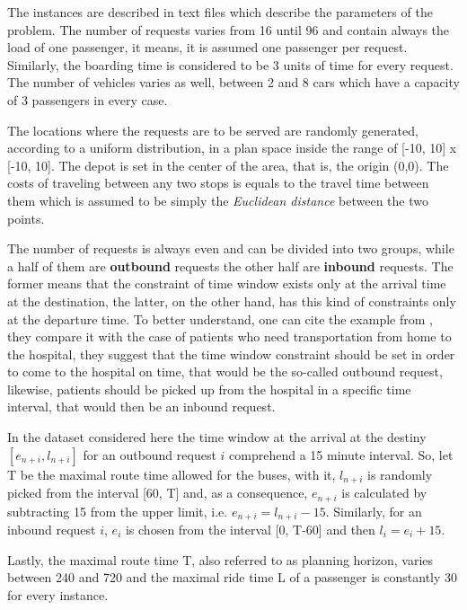 \documentclass[tuberlin,cic,tc,openright,english,noabntcite,oneside]{iiufrgs}
\begin{document}
The instances are described in text files which describe the parameters of the problem. The number of requests varies from 16 until 96 and contain always the load of one passenger, it means, it is assumed one passenger per request. Similarly, the boarding time is considered to be 3 units of time for every request. The number of vehicles varies as well, between 2 and 8 cars which have a capacity of 3 passengers in every case.

The locations where the requests are to be served are randomly generated, according to a uniform distribution, in a plan space inside the range of [-10, 10] x [-10, 10]. The depot is set in the center of the area, that is, the origin (0,0). The costs of traveling between any two stops is equals to the travel time between them which is assumed to be simply the \emph{Euclidean distance} between the two points.

The number of requests is always even and can be divided into two groups, while a half of them are \textbf{outbound} requests the other half are \textbf{inbound} requests. The former means that the constraint of time window exists only at the arrival time at the destination, the latter, on the other hand, has this kind of constraints only at the departure time. To better understand, one can cite the example from \textcite[p. 29]{cordeau_dial--ride_2007}, they compare it with the case of patients who need transportation from home to the hospital, they suggest that the time window constraint should be set in order to come to the hospital on time, that would be the so-called outbound request, likewise, patients should be picked up from the hospital in a specific time interval, that would then be an inbound request.

In the dataset considered here the time window at the arrival at the destiny $[e_{n+i}, l_{n+i}]$ for an outbound request $i$ comprehend a 15 minute interval. So, let T be the maximal route time allowed for the buses, with it, $l_{n+i}$ is randomly picked from the interval [60, T] and, as a consequence, $e_{n+i}$ is calculated by subtracting 15 from the upper limit, i.e. $e_{n+i} = l_{n+i} - 15$. Similarly, for an inbound request $i$, $e_i$ is chosen from the interval [0, T-60] and then $l_i = e_i + 15$.

Lastly, the maximal route time T, also referred to as planning horizon, varies between 240 and 720 and the maximal ride time L of a passenger is constantly 30 for every instance.
\end{document}
